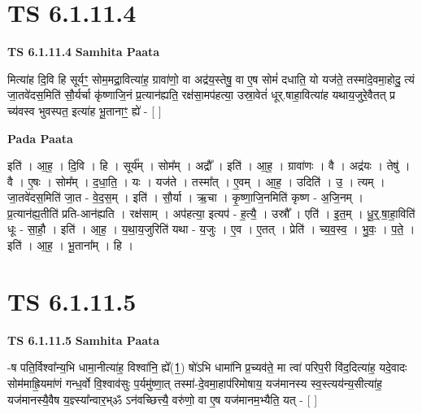 \documentclass[17pt]{extarticle}
\begin{document}
\section*{ TS 6.1.11.4 }

\textbf{TS 6.1.11.4 } \newline
\textbf{Samhita Paata} \newline

मित्या॑ह दि॒वि हि सूर्यꣳ॒॒ सोम॒मद्रा॒वित्या॑ह॒ ग्रावा॑णो॒ वा अद्र॑य॒स्तेषु॒ वा ए॒ष सोमं॑ दधाति॒ यो यज॑ते॒ तस्मा॑दे॒वमा॒होदु॒ त्यं जा॒तवे॑दस॒मिति॑ सौ॒र्यर्चा कृ॑ष्णाजि॒नं प्र॒त्यान॑ह्यति॒ रक्ष॑सा॒मप॑हत्या॒ उस्रा॒वेतं॑ धूर्.षाहा॒वित्या॑ह यथाय॒जुरे॒वैतत् प्र च्य॑वस्व भुवस्पत॒ इत्या॑ह भू॒तानाꣳ॒॒ ह्ये॑ - [  ] \newline

\textbf{Pada Paata} \newline

इति॑ । आ॒ह॒ । दि॒वि । हि । सूर्य᳚म् । सोम᳚म् । अद्रौ᳚ । इति॑ । आ॒ह॒ । ग्रावा॑णः । वै । अद्र॑यः । तेषु॑ । वै । ए॒षः । सोम᳚म् । द॒धा॒ति॒ । यः । यज॑ते । तस्मा᳚त् । ए॒वम् । आ॒ह॒ । उदिति॑ । उ॒ । त्यम् । जा॒तवे॑दस॒मिति॑ जा॒त - वे॒द॒स॒म् । इति॑ । सौ॒र्या । ऋ॒चा । कृ॒ष्णा॒जि॒नमिति॑ कृष्ण - अ॒जि॒नम् । प्र॒त्यान॑ह्य॒तीति॑ प्रति-आन॑ह्यति । रक्ष॑साम् । अप॑हत्या॒ इत्यप॑ - ह॒त्यै॒ । उस्रौ᳚ । एति॑ । इ॒त॒म् । धू॒र्॒.षा॒हा॒विति॑ धूः - सा॒हौ॒ । इति॑ । आ॒ह॒ । य॒था॒य॒जुरिति॑ यथा - य॒जुः । ए॒व । ए॒तत् । प्रेति॑ । च्य॒व॒स्व॒ । भु॒वः॒ । प॒ते॒ । इति॑ । आ॒ह॒ । भू॒ताना᳚म् । हि ।  \newline




\section*{ TS 6.1.11.5 }

\textbf{TS 6.1.11.5 } \newline
\textbf{Samhita Paata} \newline

-ष पति॒र्विश्वा᳚न्य॒भि धामा॒नीत्या॑ह॒ विश्वा॑नि॒ ह्ये᳚(1॒) षो॑ऽभि धामा॑नि प्र॒च्यव॑ते॒ मा त्वा॑ परिप॒री वि॑द॒दित्या॑ह॒ यदे॒वादः सोम॑माह्रि॒यमा॑णं गन्ध॒र्वो वि॒श्वाव॑सुः प॒र्यमु॑ष्णा॒त् तस्मा॑-दे॒वमा॒हाप॑रिमोषाय॒ यज॑मानस्य स्व॒स्त्यय॑न्य॒सीत्या॑ह॒ यज॑मानस्यै॒वैष य॒ज्ञ्स्या᳚न्वार॒भ्ॐ ऽन॑वच्छित्त्यै॒ वरु॑णो॒ वा ए॒ष यज॑मानम॒भ्यैति॒ यत् - [  ] \newline
\end{document}

